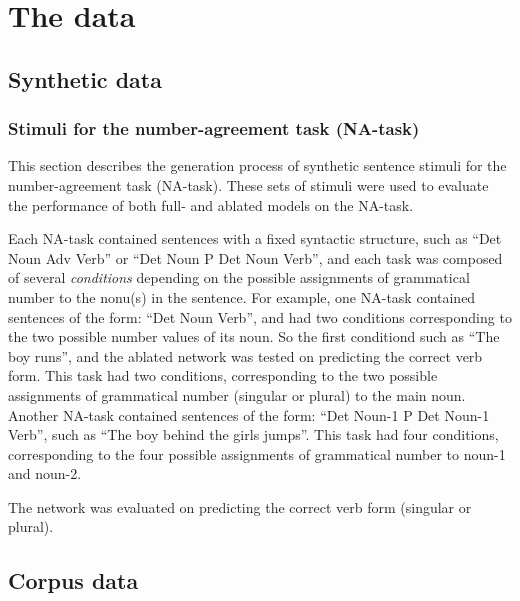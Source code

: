 \section{The data}
\textcolor{gray}{\lipsum[1]}

\subsection{Synthetic data}

\subsubsection{Stimuli for the number-agreement task (NA-task)}
This section describes the generation process of synthetic sentence stimuli for the number-agreement task (NA-task). 
These sets of stimuli were used to evaluate the performance of both full- and ablated models on the NA-task. 

Each NA-task contained sentences with a fixed syntactic structure, such as ``Det Noun Adv Verb'' or ``Det Noun P Det Noun Verb'', and each task was composed of several \textit{conditions} depending on the possible assignments of grammatical number to the nonu(s) in the sentence. 
For example, one NA-task contained sentences of the form: ``Det Noun Verb'', and had two conditions corresponding to the two possible number values of its noun. 
So the first conditiond such as ``The boy runs'', and the ablated network was tested on predicting the correct verb form. 
This task had two conditions, corresponding to the two possible assignments of grammatical number (singular or plural) to the main noun. 
Another NA-task contained sentences of the form: ``Det Noun-1 P Det Noun-1 Verb'', such as ``The boy behind the girls jumps''. 
This task had four conditions, corresponding to the four possible assignments of grammatical number to noun-1 and noun-2.

The network was evaluated on predicting the correct verb form (singular or plural).

\subsection{Corpus data}

\textcolor{gray}{\lipsum[1]}
